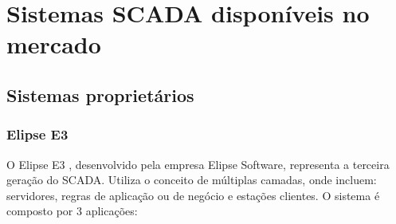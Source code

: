     \begin{figure}[!h]
{}	
\end{figure}

\section{Sistemas SCADA disponíveis no mercado}
\label{sec:sistemas-scada}

\subsection{Sistemas proprietários}
\label{sec:sistemas-scada-proprietarios}

\subsubsection{Elipse E3}
\label{sec:elipse}

    O Elipse E3 \cite{Elipse}, desenvolvido pela empresa Elipse Software, representa a terceira geração do \gls{SCADA}. Utiliza o conceito de múltiplas camadas, onde incluem: servidores, regras de aplicação ou de negócio e estações clientes. O sistema é composto por 3 aplicações: 
    
